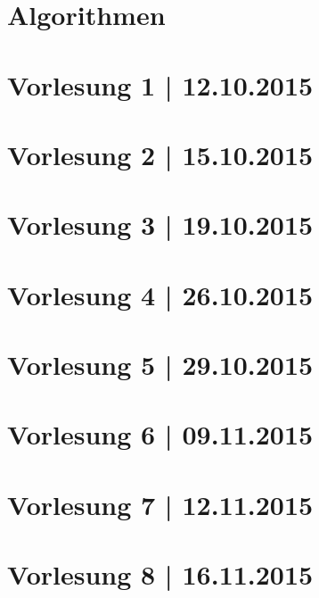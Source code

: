 



\maketitle
\thispagestyle{empty}

\newpage
\tableofcontents %
\clearpage

\newpage
\part{Algorithmen}

\part*{Vorlesung 1 | 12.10.2015}

\newpage
\part*{Vorlesung 2 | 15.10.2015}


\newpage
\part*{Vorlesung 3 | 19.10.2015}


\newpage
\part*{Vorlesung 4 | 26.10.2015}

\newpage
\part*{Vorlesung 5 | 29.10.2015}

\newpage
\part*{Vorlesung 6 | 09.11.2015}

\newpage
\part*{Vorlesung 7 | 12.11.2015}

\newpage
\part*{Vorlesung 8 | 16.11.2015}

